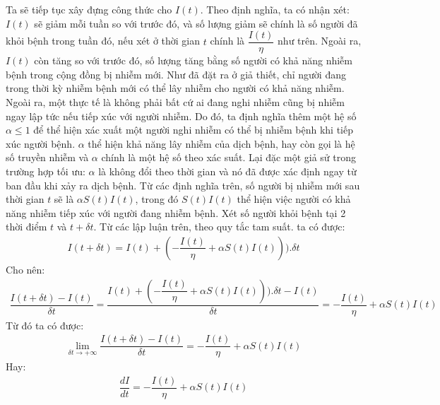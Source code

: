 \documentclass[a4paper]{article}
\begin{document}
Ta sẽ tiếp tục xây đựng công thức cho $I(t)$. Theo định nghĩa, ta có nhận xét: $I(t)$ sẽ giảm mỗi tuần so với trước đó, và số lượng giảm sẽ chính là số người đã khỏi bệnh trong tuần đó, nếu xét ở thời gian $t$ chính là  $\dfrac{I(t)}{\eta}$ như trên. Ngoài ra, $I(t)$ còn tăng so với trước đó, số lượng tăng bằng số người có khả năng nhiễm bệnh trong cộng đồng bị nhiễm mới. Như đã đặt ra ở giả thiết, chỉ người đang trong thời kỳ nhiễm bệnh mới có thể lây nhiễm cho người có khả năng nhiễm. Ngoài ra, một thực tế là không phải bất cứ ai đang nghi nhiễm cũng bị nhiễm ngay lập tức nếu tiếp xúc với người nhiễm. Do đó, ta định nghĩa thêm một hệ số $\alpha \leq 1$ để thể 
hiện xác xuất một người nghi nhiễm có thể bị nhiễm bệnh khi tiếp xúc người bệnh. $\alpha $ thể hiện khả năng lây nhiễm của dịch bệnh, hay còn gọi là hệ số truyền nhiễm và $\alpha$ chính là một hệ số theo xác suất. Lại đặc một giả sử trong trường hợp tối ưu: $\alpha$ là không đổi theo thời gian và nó đã được xác định ngay từ ban đầu khi xảy ra dịch bệnh. Từ các định nghĩa trên, số người bị nhiễm mới 
sau thời gian $t$ sẽ là $\alpha S(t)I(t)$, trong đó $S(t)I(t)$ thể hiện việc người có khả năng nhiễm tiếp xúc với người đang nhiễm bệnh. Xét số người khỏi bệnh tại 2 thời điểm $t$ và $t +\delta t$. Từ các lập luận trên, theo quy tắc tam suất. ta có được:
\begin{align*}
    I(t+\delta t) = I(t) + (- \dfrac{I(t)}{\eta} + \alpha S(t)I(t))).\delta t
\end{align*}
Cho nên: 
\begin{align*}
    \dfrac{I(t+\delta t)-I(t)}{\delta t} =\dfrac {I(t) + (- \dfrac{I(t)}{\eta} + \alpha S(t)I(t))).\delta t - I(t) }{\delta t} = - \dfrac{I(t)}{\eta} + \alpha S(t)I(t)
\end{align*}
Từ đó ta có được: 
\begin{align*}
    \lim_{\delta t\rightarrow +\infty}\dfrac{I(t+\delta t)-I(t)}{\delta t} = - \dfrac{I(t)}{\eta} + \alpha S(t)I(t)
\end{align*}
Hay:
\begin{align*}
    \dfrac{dI}{dt} = - \dfrac{I(t)}{\eta} + \alpha S(t)I(t)
\end{align*}
\end{document}
